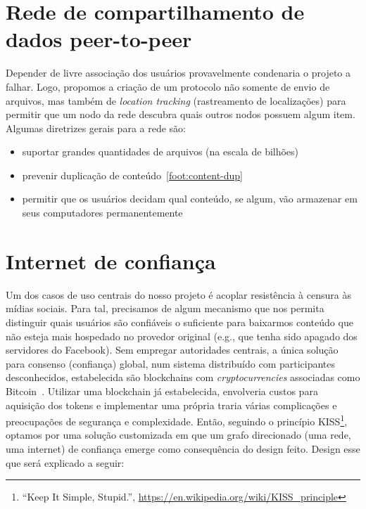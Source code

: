 \section{Rede de compartilhamento de dados peer-to-peer}

Depender de livre associação dos usuários provavelmente condenaria o projeto a falhar.
Logo, propomos a criação de um protocolo não somente de envio de arquivos, mas também de \textit{location tracking} (rastreamento de localizações) para permitir que um nodo da rede descubra quais outros nodos possuem algum item.
Algumas diretrizes gerais para a rede são:
\begin{itemize}
    \item suportar grandes quantidades de arquivos (na escala de bilhões)
    \item prevenir duplicação de conteúdo~\ref{foot:content-dup}
    \item permitir que os usuários decidam qual conteúdo, se algum, vão armazenar em seus computadores permanentemente
\end{itemize}

\section{Internet de confiança}

Um dos casos de uso centrais do nosso projeto é acoplar resistência à censura às mídias sociais.
Para tal, precisamos de algum mecanismo que nos permita distinguir quais usuários são confiáveis o suficiente para baixarmos conteúdo que não esteja mais hospedado no provedor original (e.g., que tenha sido apagado dos servidores do Facebook).
Sem empregar autoridades centrais, a única solução para consenso (confiança) global, num sistema distribuído com participantes desconhecidos, estabelecida são blockchains com \textit{cryptocurrencies} associadas como Bitcoin~\cite{nakamoto2008bitcoin}.
Utilizar uma blockchain já estabelecida, envolveria custos para aquisição dos tokens e implementar uma própria traria várias complicações e preocupações de segurança e complexidade.
Então, seguindo o princípio KISS\footnote{``Keep It Simple, Stupid.'', \url{https://en.wikipedia.org/wiki/KISS_principle}}, optamos por uma solução customizada em que um grafo direcionado (uma rede, uma internet) de confiança emerge como consequência do design feito.
Design esse que será explicado a seguir:


